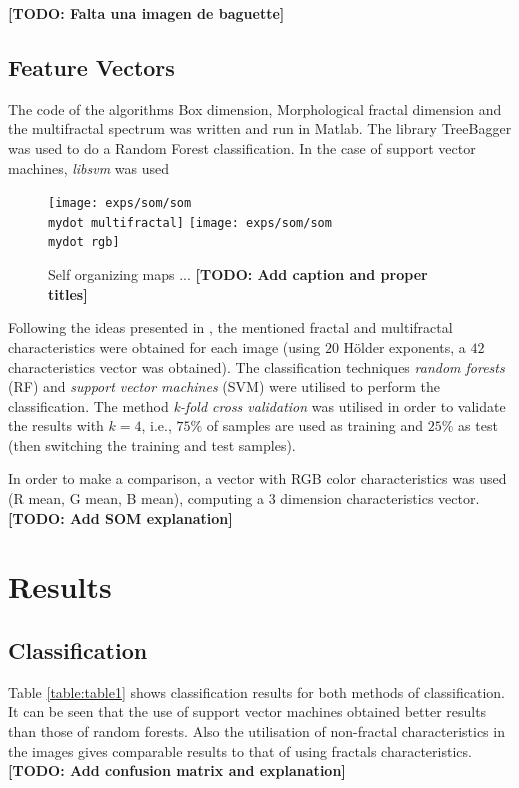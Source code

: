 \documentclass[oneside,a4paper,english,links]{amca}
\newcommand{\mydot}{.}
\newcommand{\todo}[1]{\textbf{[TODO: #1]}}
\begin{document}
\todo{Falta una imagen de baguette}

\subsection{Feature Vectors}

The code of the algorithms Box dimension, Morphological fractal dimension and the multifractal spectrum was written and run in Matlab. The library TreeBagger was used to do a Random Forest classification. In the case of support vector machines, {\em libsvm} was used~\cite{Chang2011}

\begin{figure}[]
\centering
\texttt{[image: exps/som/som\\mydot multifractal]}
\texttt{[image: exps/som/som\\mydot rgb]}
\caption{Self organizing maps ... \todo{Add caption and proper titles}}
\label{fig:soms}
\end{figure}


Following the ideas presented in \cite{Gonzales2008}, the mentioned fractal and multifractal characteristics were obtained for each image (using $20$ H\"older exponents, a $42$ characteristics vector was obtained). The classification techniques {\em random forests} (RF) \cite{Breiman2001} and {\em support vector machines} (SVM) \cite{Boser92} were utilised to perform the classification. The method {\em k-fold cross validation} was utilised in order to validate the results with $k = 4$, i.e., $75\%$ of samples are used as training and $25\%$ as test (then switching the training and test samples).

In order to make a comparison, a vector with RGB color characteristics was used (R mean, G mean, B mean), computing a $3$ dimension characteristics vector.  \todo{Add SOM explanation}




\section{Results}

\subsection{Classification}
Table \ref{table:table1} shows classification results for both methods of classification. It can be seen that the use of support vector machines obtained better results than those of random forests. Also the utilisation of non-fractal characteristics in the images gives comparable results to that of using fractals characteristics.
\todo{Add confusion matrix and explanation}
\end{document}
